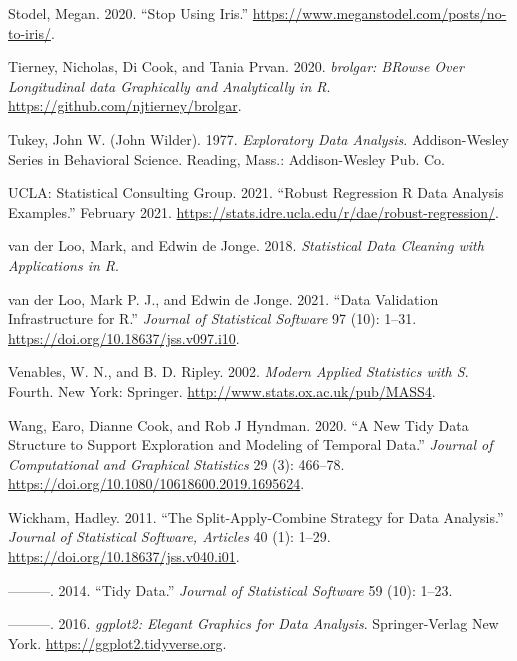 \documentclass{article}
\begin{document}
\leavevmode\hypertarget{ref-notiris}{}%
Stodel, Megan. 2020. ``Stop Using Iris.'' \url{https://www.meganstodel.com/posts/no-to-iris/}.

\leavevmode\hypertarget{ref-brolgar}{}%
Tierney, Nicholas, Di Cook, and Tania Prvan. 2020. \emph{brolgar: BRowse Over Longitudinal data Graphically and Analytically in R}. \url{https://github.com/njtierney/brolgar}.

\leavevmode\hypertarget{ref-tukey}{}%
Tukey, John W. (John Wilder). 1977. \emph{Exploratory Data Analysis}. Addison-Wesley Series in Behavioral Science. Reading, Mass.: Addison-Wesley Pub. Co.

\leavevmode\hypertarget{ref-rlm}{}%
UCLA: Statistical Consulting Group. 2021. ``Robust Regression \textbar{} R Data Analysis Examples.'' February 2021. \url{https://stats.idre.ucla.edu/r/dae/robust-regression/}.

\leavevmode\hypertarget{ref-LooMarkvander2018Sdcw}{}%
van der Loo, Mark, and Edwin de Jonge. 2018. \emph{Statistical Data Cleaning with Applications in R}.

\leavevmode\hypertarget{ref-validate}{}%
van der Loo, Mark P. J., and Edwin de Jonge. 2021. ``Data Validation Infrastructure for R.'' \emph{Journal of Statistical Software} 97 (10): 1--31. \url{https://doi.org/10.18637/jss.v097.i10}.

\leavevmode\hypertarget{ref-mass}{}%
Venables, W. N., and B. D. Ripley. 2002. \emph{Modern Applied Statistics with S}. Fourth. New York: Springer. \url{http://www.stats.ox.ac.uk/pub/MASS4}.

\leavevmode\hypertarget{ref-tsibble}{}%
Wang, Earo, Dianne Cook, and Rob J Hyndman. 2020. ``A New Tidy Data Structure to Support Exploration and Modeling of Temporal Data.'' \emph{Journal of Computational and Graphical Statistics} 29 (3): 466--78. \url{https://doi.org/10.1080/10618600.2019.1695624}.

\leavevmode\hypertarget{ref-plyr}{}%
Wickham, Hadley. 2011. ``The Split-Apply-Combine Strategy for Data Analysis.'' \emph{Journal of Statistical Software, Articles} 40 (1): 1--29. \url{https://doi.org/10.18637/jss.v040.i01}.

\leavevmode\hypertarget{ref-WickhamHadley2014TD}{}%
---------. 2014. ``Tidy Data.'' \emph{Journal of Statistical Software} 59 (10): 1--23.

\leavevmode\hypertarget{ref-ggplot2}{}%
---------. 2016. \emph{ggplot2: Elegant Graphics for Data Analysis}. Springer-Verlag New York. \url{https://ggplot2.tidyverse.org}.
\end{document}
